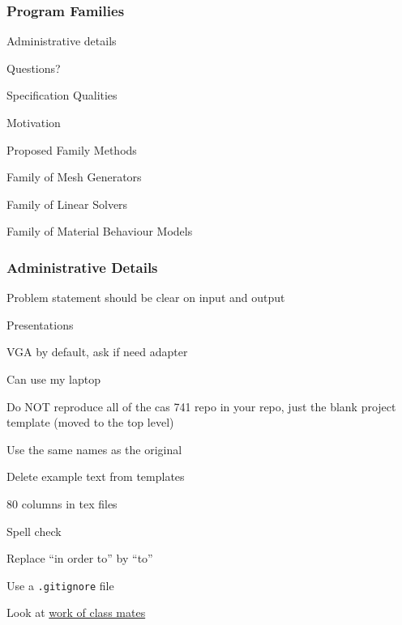 \documentclass[t,12pt,numbers,fleqn]{beamer}
\newcounter{temp}
\begin{document}



\begin{frame}
\frametitle{Program Families}

\bi
\item Administrative details
\item Questions?
\item Specification Qualities
\item Motivation
\item Proposed Family Methods
\item Family of Mesh Generators
\item Family of Linear Solvers
\item Family of Material Behaviour Models
\ei
\end{frame}


\begin{frame}
\frametitle{Administrative Details}

\bi
\item Problem statement should be clear on input and output
\item Presentations
\bi
\item VGA by default, ask if need adapter
\item Can use my laptop
\ei
\item Do NOT reproduce all of the cas 741 repo in your repo, just the blank
  project template (moved to the top level)
\item Use the same names as the original
\item Delete example text from templates
\item 80 columns in tex files
\item Spell check
\item Replace ``in order to'' by ``to''
\item Use a \texttt{.gitignore} file
\item Look at \href{https://gitlab.cas.mcmaster.ca/smiths/cas741/blob/master/Repos.xlsx}{work of class mates}
\ei

\end{frame}

\end{document}
